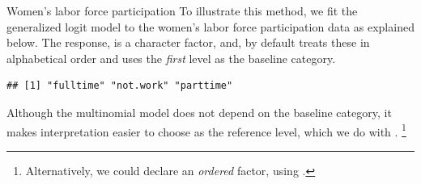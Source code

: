 \documentclass[11pt]{book}
\renewenvironment{knitrout}{\small\renewcommand{\baselinestretch}{.85}}{} %
\begin{document}
\begin{Example}[wlfpart2]{Women's labor force participation}
To illustrate this method, we fit the generalized logit model to the
women's labor force participation data as explained
below. The response,  is a character
factor, and, by default
 treats these in alphabetical order
and uses the \emph{first} level as the baseline category.

\begin{knitrout}
\color{fgcolor}\begin{kframe}
\begin{alltt}
\hlopt{$}
\end{alltt}
\begin{verbatim}
## [1] "fulltime" "not.work" "parttime"
\end{verbatim}
\end{kframe}
\end{knitrout}
Although the multinomial model does not depend on the baseline
category, it makes interpretation easier to choose 
as the reference level, which we do with .%
\footnote{
Alternatively, we could declare  an \emph{ordered}
factor, using  .
}

\begin{knitrout}
\color{fgcolor}\begin{kframe}
\begin{alltt}
\hlopt{$} \hlkwb{<-} \hlopt{$} \hlstd{=}\hlstd{)}
\end{alltt}
\end{kframe}
\end{knitrout}


\end{Example}
\end{document}
